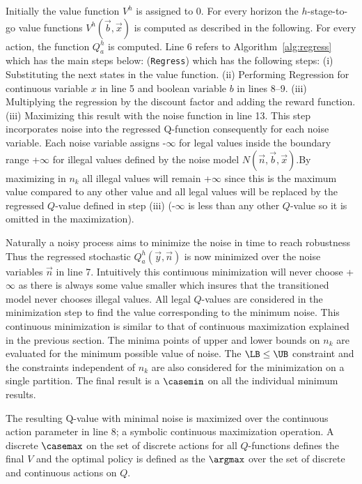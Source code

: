 Initially the value function $V^h$ is assigned to 0. For every horizon the $h$-stage-to-go value functions $V^h(\vec{b},\vec{x})$ is computed as described in the following.  
For every action, the function $Q^h_a$ is computed. Line 6 refers to Algorithm~\ref{alg:regress} which has the main steps below:
(\texttt{Regress}) which has the following steps: 
(i) Substituting the next states in the value function.
(ii) Performing Regression for continuous variable $x$ in line 5 and boolean variable $b$ in lines 8--9.
(iii) Multiplying the regression by the discount factor and adding the reward function.
(iii) Maximizing this result with the noise function in line 13. This step incorporates noise into the regressed Q-function consequently for each noise variable. Each noise variable assigns -$\infty$ for legal values inside the boundary range +$\infty$ for illegal values defined by the noise model $N(\vec{n},\vec{b},\vec{x})$.By maximizing in $n_k$ all illegal values will remain +$\infty$ since this is the maximum value compared to any other value and all legal values will be replaced by the regressed $Q$-value defined in step (iii) (-$\infty$ is less than any other $Q$-value so it is omitted in the maximization). 

Naturally a noisy process aims to minimize the noise in time to reach robustness Thus the regressed stochastic $Q_a^{h}(\vec{y},\vec{n})$ is now minimized over the noise variables $\vec{n}$ in line 7. Intuitively this continuous minimization will never choose +$\infty$ as there is always some value smaller which insures that the transitioned model never chooses illegal values. All legal $Q$-values are considered in the minimization step to find the value corresponding to the minimum noise.  
This continuous minimization is similar to that of continuous maximization explained in the previous section. The minima points of upper and lower bounds on $n_k$ are evaluated for the minimum possible value of noise. The $\LB \leq \UB$ constraint and the constraints independent of $n_k$ are also considered for the minimization on a single partition. The final result is a $\casemin$ on all the individual minimum results. 

The resulting Q-value with minimal noise is maximized over the continuous action parameter in line 8; a symbolic continuous maximization operation.  A discrete $\casemax$ on the set of discrete actions  for all $Q$-functions defines the final $V$ and the optimal policy is defined as the $\argmax$  over the set of discrete and continuous actions on $Q$. 